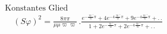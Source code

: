 \[
\begin{gathered}\text{Konstantes Glied}\quad
\\[7pt]\quad{}(S\varphi)^{2}=\frac{8\pi\pi}{\mu\mu\varpi\varpi}\,.
\frac{e^{-\frac{\varpi'}{\varpi}\pi}+4e^{-4\frac{\varpi'}{\varpi}\pi}+9e^{-4\frac{\varpi'}{\varpi}\pi}+ .\,.}
{1+2e^{-\frac{\varpi'}{\varpi}\pi}+2e^{-4\frac{\varpi'}{\varpi}\pi}+ .\,.}\end{gathered}
\]
\clearpage
\endgroup
